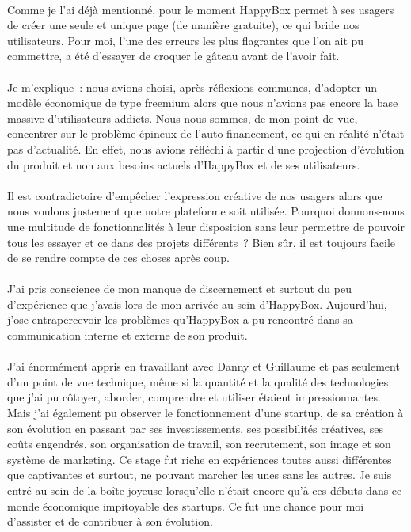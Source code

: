\documentclass[11pt, a4paper ]{article}
\begin{document}
\begin{spacing}{1.5}
\paragraph{}
Comme je l'ai déjà mentionné, pour le moment HappyBox permet à ses usagers de créer une seule et unique page (de manière gratuite), ce qui bride nos utilisateurs.
Pour moi, l'une des erreurs les plus flagrantes que l'on ait pu commettre, a été d'essayer de croquer le gâteau avant de l'avoir fait.
\paragraph{}
Je m'explique : nous avions choisi, après réflexions communes, d'adopter un modèle économique de type freemium alors que nous n'avions pas encore la base massive d'utilisateurs addicts. Nous nous sommes, de mon point de vue, concentrer sur le problème épineux de l'auto-financement, ce qui en réalité n'était pas d'actualité. En effet, nous avions réfléchi à partir d'une projection d'évolution du produit et non aux besoins actuels d'HappyBox et de ses utilisateurs.
\paragraph{}
Il est contradictoire d'empêcher l'expression créative de nos usagers alors que nous voulons justement que notre plateforme soit utilisée. Pourquoi donnons-nous une multitude de fonctionnalités à leur disposition sans leur permettre de pouvoir tous les essayer et ce dans des projets différents ? Bien sûr, il est toujours facile de se rendre compte de ces choses après coup.
\paragraph{}
J'ai pris conscience de mon manque de discernement et surtout du peu d'expérience que j'avais lors de mon arrivée au sein d'HappyBox. Aujourd'hui, j'ose entrapercevoir les problèmes qu'HappyBox a pu rencontré dans sa communication interne et externe de son produit.
\paragraph{}
J'ai énormément appris en travaillant avec Danny et Guillaume et pas seulement d'un point de vue technique, même si la quantité et la qualité des technologies que j'ai pu côtoyer, aborder, comprendre et utiliser étaient impressionnantes. Mais j'ai également pu observer le fonctionnement d'une startup, de sa création à son évolution en passant par ses investissements, ses possibilités créatives, ses coûts engendrés, son organisation de travail, son recrutement, son image et son système de marketing. Ce stage fut riche en expériences toutes aussi différentes que captivantes et surtout, ne pouvant marcher les unes sans les autres.
Je suis entré  au sein de la boîte joyeuse lorsqu'elle n'était encore qu'à ces débuts dans ce monde économique impitoyable des startups. Ce fut une chance pour moi d'assister et de contribuer à son évolution.



\end{spacing}
\end{document}
